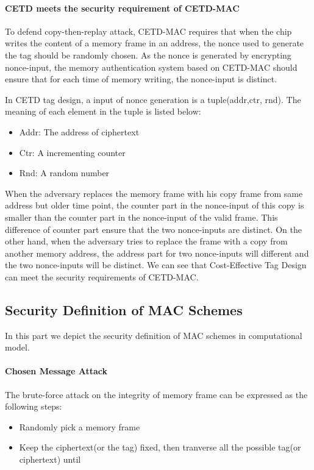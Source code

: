 \documentclass{article}
\begin{document}
\paragraph{CETD meets the security requirement of CETD-MAC}
To defend copy-then-replay attack, CETD-MAC requires that when the chip writes
the content of a memory frame in an address, the nonce used to generate the tag
should be randomly chosen. As the nonce is generated by encrypting nonce-input,
the memory authentication system based on CETD-MAC should ensure that for each
time of memory writing, the nonce-input is distinct.

In CETD tag design, a input of nonce generation is a tuple(addr,ctr, rnd). The meaning of each element in the tuple is listed below: 
\begin{itemize}
	\item Addr: The address of ciphertext
	\item Ctr: A incrementing counter 
	\item Rnd: A random number
\end{itemize}
When the adversary replaces the memory frame with his copy frame from same
address but older time point, the counter part in the nonce-input of this copy
is smaller than the counter part in the nonce-input of the valid frame. This
difference of counter part ensure that the two nonce-inputs are distinct. 
On the other hand, when the adversary tries to replace the frame with a copy
from another memory address, the address part for two nonce-inputs will
different and the two nonce-inputs will be distinct.
We can see that Cost-Effective Tag Design can meet the security requirements of
CETD-MAC.

\subsection{Security Definition of MAC Schemes}
In this part we depict the security definition of MAC schemes in computational model.  
\paragraph{Chosen Message Attack}
The brute-force attack on the integrity of memory frame can be expressed as the following steps:
\begin{itemize}
	\item Randomly pick a memory frame
	\item Keep the ciphertext(or the tag) fixed, then tranverse all the possible tag(or ciphertext) until
\end{itemize}
\end{document}
